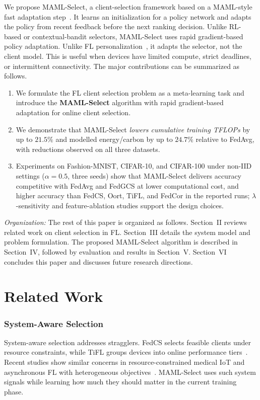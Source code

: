 \documentclass[journal]{IEEEtran}
\newcommand{\revision}[1]{#1}
\begin{document}
\revision{We propose MAML-Select, a client-selection framework based on a MAML-style fast adaptation step}~\cite{finn2017model}. \revision{It learns an initialization for a policy network and adapts the policy from recent feedback before the next ranking decision. Unlike RL-based or contextual-bandit selectors, MAML-Select uses rapid gradient-based policy adaptation. Unlike FL personalization}~\cite{fallah2020personalized}, \revision{it adapts the selector, not the client model. This is useful when devices have limited compute, strict deadlines, or intermittent connectivity.} The major contributions can be summarized as follows.
\begin{enumerate}
\setlength{\itemsep}{0pt}
\setlength{\topsep}{1pt}
		\item We formulate the FL client selection problem as a meta-learning task and introduce the \textbf{MAML-Select} algorithm with \revision{rapid gradient-based} adaptation for online client selection.
		\item We demonstrate that MAML-Select \revision{\textit{lowers cumulative training TFLOPs} by up to $21.5\%$ and modelled energy/carbon by up to $24.7\%$ relative to FedAvg, with reductions observed on all three datasets}.
	\item \revision{Experiments on Fashion-MNIST, CIFAR-10, and CIFAR-100 under non-IID settings ($\alpha = 0.5$, three seeds) show that MAML-Select delivers accuracy competitive with FedAvg and FedGCS at lower computational cost, and higher accuracy than FedCS, Oort, TiFL, and FedCor in the reported runs; $\lambda$-sensitivity and feature-ablation studies support the design choices.}
\end{enumerate}

\textit{Organization:} The rest of this paper is organized as follows. Section~II reviews related work on client selection in FL. Section~III details the system model and problem formulation. The proposed MAML-Select algorithm is described in Section~IV, followed by evaluation and results in Section~V. Section~VI concludes this paper and discusses future research directions.

\section{Related Work}
\subsubsection{System-Aware Selection}
System-aware selection addresses stragglers. FedCS selects feasible clients under resource constraints, while TiFL groups devices into online performance tiers~\cite{nishio2019client,chai2020tifl}. Recent studies show similar concerns in resource-constrained medical IoT and asynchronous FL with heterogeneous objectives~\cite{tapwal2026stragglers,forootani2026asynchronous}. MAML-Select uses such system signals while learning how much they should matter in the current training phase.
\end{document}

